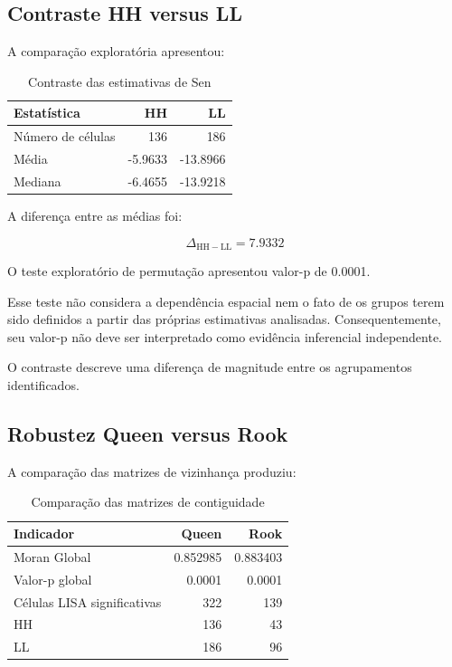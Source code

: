 \documentclass[12pt,a4paper]{article}
\begin{document}
\subsection{Contraste HH versus LL}

A comparação exploratória apresentou:

\begin{table}[H]
\centering
\caption{Contraste das estimativas de Sen}
\begin{tabular}{lrr}
\toprule
Estatística & HH & LL \\
\midrule
Número de células & 136 & 186 \\
Média & -5.9633 & -13.8966 \\
Mediana & -6.4655 & -13.9218 \\
\bottomrule
\end{tabular}
\end{table}

A diferença entre as médias foi:

\begin{equation}
\Delta_{\mathrm{HH-LL}} = 7.9332
\end{equation}

O teste exploratório de permutação apresentou
valor-p de 0.0001.

Esse teste não considera a dependência espacial
nem o fato de os grupos terem sido definidos
a partir das próprias estimativas analisadas.
Consequentemente, seu valor-p não deve ser
interpretado como evidência inferencial independente.

O contraste descreve uma diferença de magnitude
entre os agrupamentos identificados.

\subsection{Robustez Queen versus Rook}

A comparação das matrizes de vizinhança produziu:

\begin{table}[H]
\centering
\caption{Comparação das matrizes de contiguidade}
\begin{tabular}{lrr}
\toprule
Indicador & Queen & Rook \\
\midrule
Moran Global & 0.852985 & 0.883403 \\
Valor-p global & 0.0001 & 0.0001 \\
Células LISA significativas & 322 & 139 \\
HH & 136 & 43 \\
LL & 186 & 96 \\
\bottomrule
\end{tabular}
\end{table}
\end{document}
